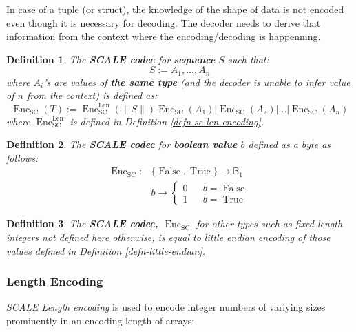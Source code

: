 \documentclass{article}
\newcommand{\assign}{:=}
\newcommand{\tmem}[1]{{\em #1\/}}
\newcommand{\tmop}[1]{\ensuremath{\operatorname{#1}}}
\newcommand{\tmstrong}[1]{\textbf{#1}}
\newcommand{\tmtextbf}[1]{{\bfseries{#1}}}
\newcommand{\tmtextit}[1]{{\itshape{#1}}}
\newtheorem{definition}{Definition}
\providecommand{\tmem}[1]{\tmtextit{#1}}
\providecommand{\tmop}[1]{\ensuremath{\mathrm{#1}}}
\providecommand{\tmstrong}[1]{\tmtextbf{#1}}
\providecommand{\tmtextbf}[1]{\tmtextbf{#1}}
\providecommand{\tmtextit}[1]{\tmtextit{#1}}
\newtheorem{definition}{Definition}
\begin{document}
In case of a tuple (or struct), the knowledge of the shape of data is not
encoded even though it is necessary for decoding. The decoder needs to derive
that information from the context where the encoding/decoding is happenning.

\begin{definition}
  \label{defn-scale-list}The {\tmstrong{SCALE codec}} for
  {\tmstrong{sequence}} $S$ such that:
  \[ S \assign A_1, \ldots, A_n \]
  where $A_i$'s are values of {\tmstrong{the same type}} (and the decoder is
  unable to infer value of $n$ from the context) is defined as:
  \[ \tmop{Enc}_{\tmop{SC}} (T) \assign \tmop{Enc}^{\tmop{Len}}_{\tmop{SC}}
     (\| S \|) \tmop{Enc}_{\tmop{SC}} (A_1) | \tmop{Enc}_{\tmop{SC}} (A_2) |
     \ldots | \tmop{Enc}_{\tmop{SC}} (A_n) \]
  where $\tmop{Enc}_{\tmop{SC}}^{\tmop{Len}}$ is defined in Definition
  \ref{defn-sc-len-encoding}.
\end{definition}

\begin{definition}
  The {\tmstrong{SCALE codec}} for {\tmstrong{boolean value}} $b$ defined as a
  byte as follows:
  \[ \begin{array}{ll}
       \tmop{Enc}_{\tmop{SC}} : & \{ \tmop{False}, \tmop{True} \} \rightarrow
       \mathbb{B}_1\\
       & b \rightarrow \left\{ \begin{array}{lcl}
         0 &  & b = \tmop{False}\\
         1 &  & b = \tmop{True}
       \end{array} \right.
     \end{array} \]
\end{definition}

\begin{definition}
  The {\tmstrong{SCALE codec, $\tmop{Enc}_{\tmop{SC}}$}} for other types such
  as fixed length integers not defined here otherwise, is equal to little
  endian encoding of those values defined in Definition
  \ref{defn-little-endian}. 
\end{definition}

\subsubsection{Length Encoding}\label{sect-int-encoding}

{\tmem{SCALE Length encoding}} is used to encode integer numbers of variying
sizes prominently in an encoding length of arrays:
\end{document}
